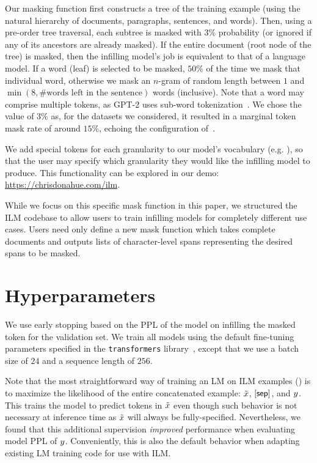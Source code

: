 Our masking function first constructs a tree of the training example (using the natural hierarchy of documents, paragraphs, sentences, and words). 
Then, using a pre-order tree traversal, each subtree is masked with $3\%$ probability (or ignored if any of its ancestors are already masked).
If the entire document (root node of the tree) is masked, then the infilling model's job is equivalent to that of a language model. 
If a word (leaf) is selected to be masked, $50\%$ of the time we mask that individual word, otherwise we mask an $n$-gram of random length between $1$ and $\min(8, \text{\# words left in the sentence})$ words (inclusive). 
Note that a word may comprise multiple tokens, as GPT-2 uses sub-word tokenization~\citep{sennrich2015neural}.
We chose the value of $3\%$ as, for the datasets we considered, it resulted in a marginal token mask rate of around $15\%$, echoing the configuration of~\citet{devlin2019bert}.

We add special tokens for each granularity to our model's vocabulary (e.g. \blankword), 
so that the user may specify which granularity they would like the infilling model to produce.
This functionality can be explored in our demo: \url{https://chrisdonahue.com/ilm}.

While we focus on this specific mask function in this paper, 
we structured the ILM codebase to allow users to train infilling models for completely different use cases. 
Users need only define a new mask function which takes complete documents and outputs lists of character-level spans representing the desired spans to be masked.

\section{Hyperparameters}\label{sec:hyperparams}

We use early stopping based on the PPL of the model on infilling the masked token for the validation set. 
We train all models using the default fine-tuning parameters specified in the \texttt{transformers} library~\citep{wolf2019transformers}, except that we use a batch size of $24$ and a sequence length of $256$. 

Note that the most straightforward way of training an LM on ILM examples () is to maximize the likelihood of the entire concatenated example: $\tilde{x}$, $\text{\sep}$, and $y$. 
This trains the model to predict tokens in $\tilde{x}$ even though such behavior is not necessary at inference time as $\tilde{x}$ will always be fully-specified. 
Nevertheless, we found that this additional supervision \emph{improved} performance when evaluating model PPL of $y$. 
Conveniently, this is also the default behavior when adapting existing LM training code for use with ILM.

